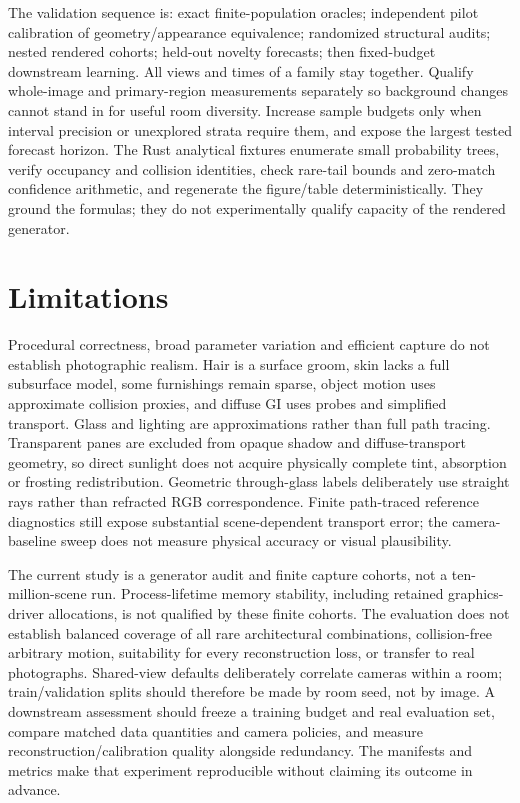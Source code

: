 \documentclass{article}
\begin{document}
The validation sequence is: exact finite-population oracles; independent pilot
calibration of geometry/appearance equivalence; randomized structural audits;
nested rendered cohorts; held-out novelty forecasts; then fixed-budget downstream
learning. All views and times of a family stay together. Qualify whole-image and
primary-region measurements separately so background changes cannot stand in
for useful room diversity. Increase sample budgets only when interval precision
or unexplored strata require them, and expose the largest tested forecast horizon.
The Rust analytical fixtures enumerate small probability trees, verify occupancy
and collision identities, check rare-tail bounds and zero-match confidence
arithmetic, and regenerate the figure/table deterministically. They ground the
formulas; they do not experimentally qualify capacity of the rendered generator.


\section{Limitations}
Procedural correctness, broad parameter variation and efficient capture do not establish photographic realism. Hair is a surface groom, skin lacks a full subsurface model, some furnishings remain sparse, object motion uses approximate collision proxies, and diffuse GI uses probes and simplified transport. Glass and lighting are approximations rather than full path tracing. Transparent panes are excluded from opaque shadow and diffuse-transport geometry, so direct sunlight does not acquire physically complete tint, absorption or frosting redistribution. Geometric through-glass labels deliberately use straight rays rather than refracted RGB correspondence. Finite path-traced reference diagnostics still expose substantial scene-dependent transport error; the camera-baseline sweep does not measure physical accuracy or visual plausibility.

The current study is a generator audit and finite capture cohorts, not a ten-million-scene run. Process-lifetime memory stability, including retained graphics-driver allocations, is not qualified by these finite cohorts. The evaluation does not establish balanced coverage of all rare architectural combinations, collision-free arbitrary motion, suitability for every reconstruction loss, or transfer to real photographs. Shared-view defaults deliberately correlate cameras within a room; train/validation splits should therefore be made by room seed, not by image. A downstream assessment should freeze a training budget and real evaluation set, compare matched data quantities and camera policies, and measure reconstruction/calibration quality alongside redundancy. The manifests and metrics make that experiment reproducible without claiming its outcome in advance.
\end{document}
